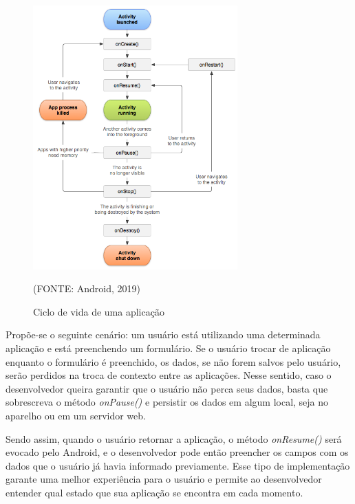 \documentclass[
    12pt,       %
    openright,      %
    twoside,      %
    a4paper,      %
    english,      %
    french,       %
    spanish,      %
    brazil,       %
    ]{abntex2}
\begin{document}
        \begin{figure}[htbp]
            \begin{center}
                \includegraphics[width=0.7\textwidth]{img/activityLifecycle.png}
            \end{center}
        \caption{\label{fig:passaro} Ciclo de vida de uma aplicação}
        \begin{center}(FONTE: Android, 2019)\end{center}
        \end{figure}

        Propõe-se o seguinte cenário: um usuário está utilizando uma determinada aplicação
        e está preenchendo um formulário. Se o usuário trocar de aplicação enquanto o formulário é
        preenchido, os dados, se não forem salvos pelo usuário, serão perdidos na troca de contexto
        entre as aplicações. Nesse sentido, caso o desenvolvedor queira garantir que o usuário não
        perca seus dados, basta que sobrescreva o método \textit{onPause()} e persistir
        os dados em algum local, seja no aparelho ou em um servidor web.

        Sendo assim, quando o usuário retornar a aplicação, o método \textit{onResume()} será evocado
        pelo Android, e o desenvolvedor pode então preencher os campos com os dados que o usuário
        já havia informado previamente. Esse tipo de implementação garante uma melhor experiência para
        o usuário e permite ao desenvolvedor entender qual estado que sua aplicação se encontra em cada
        momento.
\end{document}
